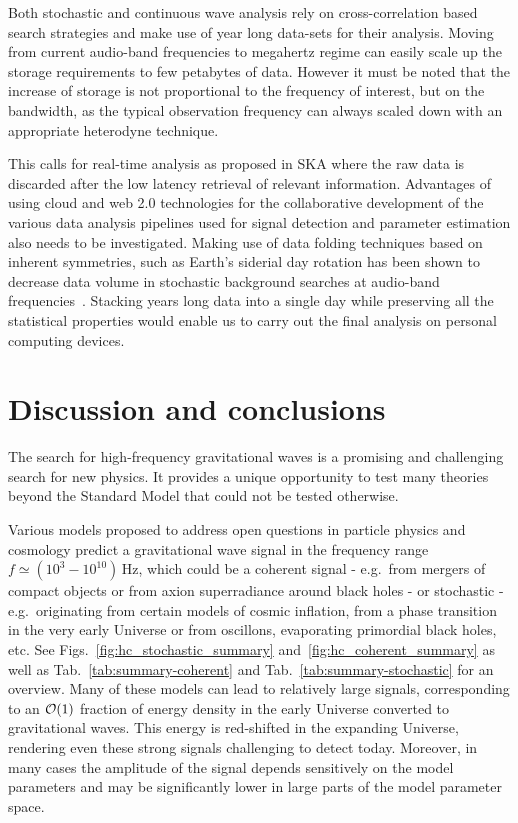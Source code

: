 \documentclass[11pt,a4paper]{article}
\begin{document}
Both stochastic and continuous wave analysis rely on cross-correlation based search strategies and make use of year long data-sets for their analysis. Moving from current audio-band frequencies to megahertz regime can easily scale up the storage requirements to few petabytes of data. However it must be noted that the increase of storage is not proportional to the frequency of interest, but on the bandwidth, as the typical observation frequency can always scaled down with an appropriate heterodyne technique.

This calls for real-time analysis as proposed in SKA where the raw data is discarded after the low latency retrieval of relevant information. Advantages of using cloud and web 2.0 technologies for the collaborative development of the various data analysis pipelines used for signal detection and parameter estimation also needs to be investigated. Making use of data folding techniques based on inherent symmetries, such as Earth's siderial day rotation has been shown to decrease data volume in stochastic background searches at audio-band frequencies~\cite{PhysRevD.92.022003}. Stacking years long data into a single day while preserving all the statistical properties would enable us to carry out the final analysis on personal computing devices.


\section{Discussion and conclusions}
\label{sec:conclusion}

The search for high-frequency gravitational waves is a promising and challenging search for new physics. It provides a unique opportunity to test many theories beyond the Standard Model that could not be tested otherwise.

Various models proposed to address open questions in particle physics and cosmology predict a gravitational wave signal in the frequency range $f \simeq (10^3 -  10^{10})\,$Hz, which could be a coherent signal - e.g.\ from mergers of compact objects or from axion superradiance around black holes - or stochastic - e.g.~originating from certain models of cosmic inflation, from a phase transition in the very early Universe or from oscillons, evaporating primordial black holes, etc. See Figs.~\ref{fig:hc_stochastic_summary} and~\ref{fig:hc_coherent_summary} as well as Tab.~\ref{tab:summary-coherent} and Tab.~\ref{tab:summary-stochastic} for an overview. Many of these models can lead to relatively large signals, corresponding to an ${\cal O}(1)$ fraction of energy density in the early Universe converted to gravitational waves. This energy is red-shifted in the expanding Universe, rendering even these strong signals challenging to detect today. Moreover, in many cases the amplitude of the signal depends sensitively on the model parameters and may be significantly lower in large parts of the model parameter space.
\end{document}
